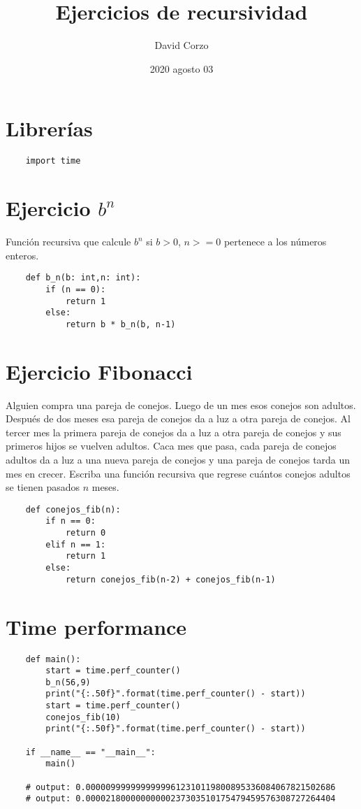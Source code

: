 \documentclass{article}
\title{Ejercicios de recursividad}
\date{2020 agosto 03} %
\author{David Corzo}
\begin{document}
\maketitle

\section{Librerías}
\begin{verbatim}
    import time
\end{verbatim}

\section{Ejercicio $b^n$}
Función recursiva que calcule $b^n$ si $b > 0$, $n >= 0$ pertenece a los números enteros.
\begin{verbatim}
    def b_n(b: int,n: int):
        if (n == 0):
            return 1
        else: 
            return b * b_n(b, n-1)
\end{verbatim}

\section{Ejercicio  Fibonacci}
Alguien compra una pareja de conejos. Luego de un mes esos conejos son adultos. Después de dos meses esa pareja de conejos da a luz a otra pareja de conejos. Al tercer mes la primera pareja de conejos da a luz a otra pareja de conejos y sus primeros hijos se vuelven adultos. Caca mes que pasa, cada pareja de conejos adultos da a luz a una nueva pareja de conejos y una pareja de conejos tarda un mes en crecer. Escriba una función recursiva que regrese cuántos conejos adultos se tienen pasados $n$ meses.
\begin{verbatim}
    def conejos_fib(n):
        if n == 0:
            return 0    
        elif n == 1:
            return 1
        else:
            return conejos_fib(n-2) + conejos_fib(n-1)
\end{verbatim}

\section{Time performance}
\begin{verbatim}
    def main():
        start = time.perf_counter()
        b_n(56,9)
        print("{:.50f}".format(time.perf_counter() - start))
        start = time.perf_counter()
        conejos_fib(10)
        print("{:.50f}".format(time.perf_counter() - start))

    if __name__ == "__main__":
        main()

    # output: 0.00000999999999999612310119800895336084067821502686
    # output: 0.00002180000000000237303510175479459576308727264404
\end{verbatim}

\end{document}

